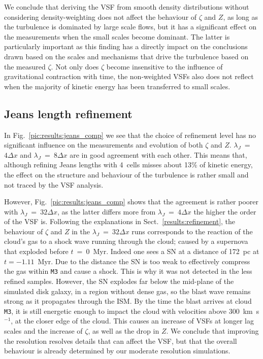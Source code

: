 We conclude that deriving the VSF from smooth density distributions without considering density-weighting does not affect the behaviour of $\zeta$ and $Z$, as long as the turbulence is dominated by large scale flows, but it has a significant effect on the measurements when the small scales become dominant.
The latter is particularly important as this finding has a directly impact on the conclusions drawn based on the scales and mechanisms that drive the turbulence based on the measured $\zeta$.
Not only does $\zeta$ become insensitive to the influence of gravitational contraction with time, the non-weighted VSFs also does not reflect when the majority of kinetic energy has been transferred to small scales. 


\subsection{Jeans length refinement}\label{discussion:refinement}

In Fig.~\ref{pic:results:jeans_comp} we see that the choice of refinement level has no significant influence on the measurements and evolution of both $\zeta$ and $Z$. 
$\lambda_J$~=~$4\Delta{}x$ and $\lambda_J$~=~$8\Delta{}x$ are in good agreement with each other.
This means that, although refining Jeans lengths with 4~cells misses about 13\% of kinetic energy, the effect on the structure and behaviour of the turbulence is rather small and not traced by the VSF analysis.

However, Fig.~\ref{pic:results:jeans_comp} shows that the agreement is rather poorer with $\lambda_J$~=~$32\Delta{}x$, as the latter differs more from $\lambda_J$~=~$4\Delta{}x$ the higher the order of the VSF is.
Following the explanations in Sect.~\ref{results:refinement}, the behaviour of $\zeta$ and $Z$ in the $\lambda_J$~=~$32\Delta{}x$ runs corresponds to the reaction of the cloud's gas to a shock wave running through the cloud; caused by a supernova that exploded before $t$~=~0~Myr. 
Indeed one sees a SN at a distance of 172~pc at $t=-1.11$~Myr. 
Due to the distance the SN is too weak to effectively compress the gas within \texttt{M3} and cause a shock.
This is why it was not detected in the less refined samples.
However, the SN explodes far below the mid-plane of the simulated disk galaxy, in a region without dense gas, so the blast wave remains strong as it propagates through the ISM. 
By the time the blast arrives at cloud \texttt{M3}, it is still energetic enough to impact the cloud with velocities above 300~km~s$^{-1}$, at the closer edge of the cloud. 
This causes an increase of VSFs at longer lag scales and the increase of $\zeta$, as well as the drop in $Z$.
We conclude that improving the resolution resolves details that can affect the VSF, but that the overall behaviour is already determined by our moderate resolution simulations.

